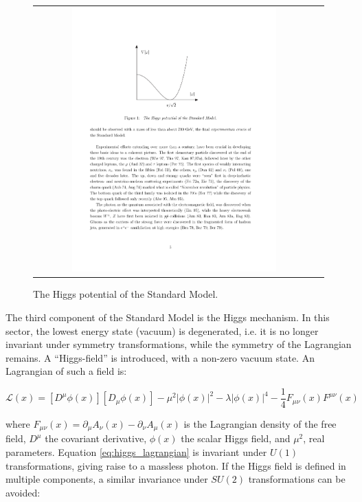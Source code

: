 \begin{figure}[tbh!]
	\centering
	\begin{tabular}{cc}
		\includegraphics[width=0.75\textwidth]{theory/pics/higgs_potential.pdf}
	\end{tabular}
	\caption{The Higgs potential of the Standard Model.}
	\label{fig:higgs_potential}
\end{figure}

The third component of the Standard Model is the Higgs mechanism. 
In this sector, the lowest energy state (vacuum) is degenerated, i.e. it is no longer invariant under symmetry transformations, while the symmetry of the Lagrangian remains. A “Higgs-field” is introduced, with a non-zero vacuum state. An Lagrangian of such a field is:

\begin{equation}
\label{eq:higgs_lagrangian}
\mathcal{L}(x) = [D^{\mu}\phi(x)][D_{\mu}\phi(x)] - \mu^{2}|\phi(x)|^{2} - \lambda|\phi(x)|^{4} -  \dfrac{1}{4}F_{\mu\nu}(x)F^{\mu\nu}(x)
\end{equation}

where \ensuremath{F_{\mu\nu}(x) =  \partial_{\mu}A_{\nu}(x) - \partial_{\nu}A_{\mu}(x)} is the Lagrangian density of the free field, \ensuremath{D^{\mu}} the covariant derivative, \ensuremath{\phi(x)} the scalar Higgs field, and \ensuremath{\mu^{2}},  real parameters.
Equation \ref{eq:higgs_lagrangian} is invariant under \ensuremath{U(1)} transformations, giving raise to a massless photon. If the Higgs field is defined in multiple components, a similar invariance under \ensuremath{SU(2)} transformations can be avoided:

